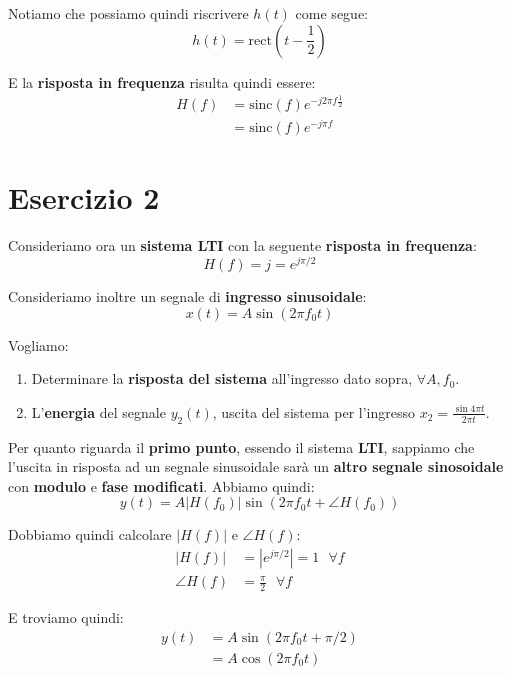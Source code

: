 Notiamo che possiamo quindi riscrivere $h(t)$ come segue:
\[
    h(t) = \text{rect} \left( t - \frac{1}{2} \right)
\]

E la \textbf{risposta in frequenza} risulta quindi essere:
\[
    \begin{aligned}
        H(f) &= \text{sinc}(f) e^{-j 2\pi f \frac{1}{2}} \\ 
             &= \text{sinc}(f) e^{-j\pi f}
    \end{aligned}
\]

\section{Esercizio 2}

Consideriamo ora un \textbf{sistema LTI} con la
seguente \textbf{risposta in frequenza}:
\[
    H(f) = j = e^{j \pi /2}
\]

Consideriamo inoltre un segnale di \textbf{ingresso sinusoidale}:
\[
    x(t) = A \sin (2\pi f_{0} t)
\]

\begin{exe}
    Vogliamo:
    \begin{enumerate}
        \item Determinare la \textbf{risposta del sistema} all'ingresso 
            dato sopra, $\forall A,f_{0}$.
        \item L'\textbf{energia} del segnale $y_{2}(t)$, uscita del sistema
            per l'ingresso $x_{2} = \frac{\sin 4\pi t}{2\pi t}$.
    \end{enumerate}
\end{exe}

Per quanto riguarda il \textbf{primo punto}, essendo il sistema \textbf{LTI},
sappiamo che l'uscita in risposta ad un segnale sinusoidale sarà
un \textbf{altro segnale sinosoidale} con \textbf{modulo} e 
\textbf{fase modificati}. Abbiamo quindi:
\[
    y(t) = A |H(f_{0})| \sin \left( 2\pi f_{0}t + \angle H(f_{0}) \right)
\]

Dobbiamo quindi calcolare $|H(f)|$ e $\angle H(f)$:
\[
    \begin{aligned}
        |H(f)| &= \left| e^{j \pi /2} \right| = 1 \text{ }\forall f \\ 
        \angle H(f) &= \frac{\pi}{2} \text{ }\forall f
    \end{aligned}
\]

E troviamo quindi:
\[
    \begin{aligned}
        y(t) &= A \sin (2\pi f_{0} t + \pi /2) \\ 
             &= A \cos (2 \pi f_{0}t)
    \end{aligned}
\]

